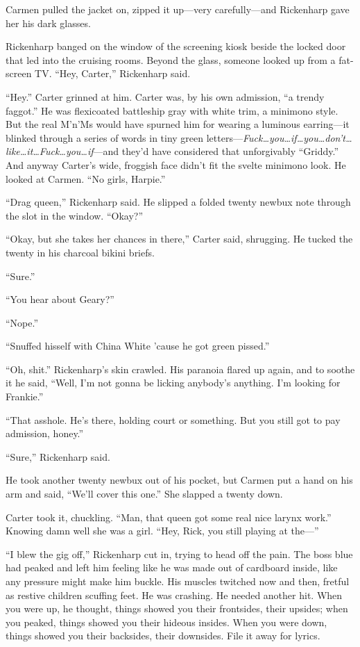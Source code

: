 Carmen pulled the jacket on, zipped it up---very carefully---and Rickenharp gave her his dark glasses.

Rickenharp banged on the window of the screening kiosk beside the locked door that led into the cruising rooms. Beyond the glass, someone looked up from a fat-screen TV. ``Hey, Carter,'' Rickenharp said.

``Hey.'' Carter grinned at him. Carter was, by his own admission, ``a trendy faggot.'' He was flexicoated battleship gray with white trim, a minimono style. But the real M'n'Ms would have spurned him for wearing a luminous earring---it blinked through a series of words in tiny green letters---\textit{Fuck\ldots you\ldots if\ldots you\ldots don't\ldots like\ldots it\ldots Fuck\ldots you\ldots if}---and they'd have considered that unforgivably ``Griddy.'' And anyway Carter's wide, froggish face didn't fit the svelte minimono look. He looked at Carmen. ``No girls, Harpie.''

``Drag queen,'' Rickenharp said. He slipped a folded twenty newbux note through the slot in the window. ``Okay?''

``Okay, but she takes her chances in there,'' Carter said, shrugging. He tucked the twenty in his charcoal bikini briefs.

``Sure.''

``You hear about Geary?''

``Nope.''

``Snuffed hisself with China White 'cause he got green pissed.''

``Oh, shit.'' Rickenharp's skin crawled. His paranoia flared up again, and to soothe it he said, ``Well, I'm not gonna be licking anybody's anything. I'm looking for Frankie.''

``That asshole. He's there, holding court or something. But you still got to pay admission, honey.''

``Sure,'' Rickenharp said.

He took another twenty newbux out of his pocket, but Carmen put a hand on his arm and said, ``We'll cover this one.'' She slapped a twenty down.

Carter took it, chuckling. ``Man, that queen got some real nice larynx work.'' Knowing damn well she was a girl. ``Hey, Rick, you still playing at the---''

``I blew the gig off,'' Rickenharp cut in, trying to head off the pain. The boss blue had peaked and left him feeling like he was made out of cardboard inside, like any pressure might make him buckle. His muscles twitched now and then, fretful as restive children scuffing feet. He was crashing. He needed another hit. When you were up, he thought, things showed you their frontsides, their upsides; when you peaked, things showed you their hideous insides. When you were down, things showed you their backsides, their downsides. File it away for lyrics.

